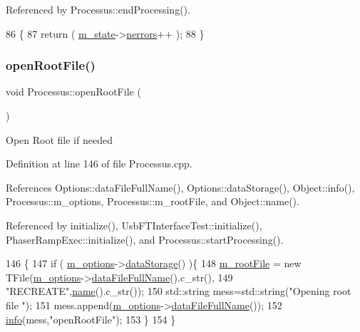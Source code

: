 Referenced by Processus\+::end\+Processing().


\begin{DoxyCode}
86                                 \{
87   \textcolor{keywordflow}{return} ( \hyperlink{classProcessus_ab3539eee42891ceae0baf4395ae7fb61}{m\_state}->\hyperlink{structProcState_a51a0f54ba62b07e07ac8518c5f32828d}{nerrors}++ );
88 \}
\end{DoxyCode}
\mbox{\label{classProcessus_aacf6812880c1d1a2bf14a4a39458f443}} 
\subsubsection{\texorpdfstring{open\+Root\+File()}{openRootFile()}}
{\footnotesize\ttfamily void Processus\+::open\+Root\+File (\begin{DoxyParamCaption}{ }\end{DoxyParamCaption})\hspace{0.3cm}{\ttfamily [inherited]}}

Open Root file if needed 

Definition at line 146 of file Processus.\+cpp.



References Options\+::data\+File\+Full\+Name(), Options\+::data\+Storage(), Object\+::info(), Processus\+::m\+\_\+options, Processus\+::m\+\_\+root\+File, and Object\+::name().



Referenced by initialize(), Usb\+F\+T\+Interface\+Test\+::initialize(), Phaser\+Ramp\+Exec\+::initialize(), and Processus\+::start\+Processing().


\begin{DoxyCode}
146                                \{
147   \textcolor{keywordflow}{if} ( \hyperlink{classProcessus_a74205f3c1e00c4448f7b3257c2351797}{m\_options}->\hyperlink{classOptions_aed7799d10139fa542055b982cb820192}{dataStorage}() )\{
148     \hyperlink{classProcessus_a76114f8cf2111e910c323a7ae05a015d}{m\_rootFile} = \textcolor{keyword}{new} TFile(\hyperlink{classProcessus_a74205f3c1e00c4448f7b3257c2351797}{m\_options}->\hyperlink{classOptions_ab1cd9f237e9c18fd72323c74565453f8}{dataFileFullName}().c\_str(),
149                            \textcolor{stringliteral}{"RECREATE"},\hyperlink{classObject_a300f4c05dd468c7bb8b3c968868443c1}{name}().c\_str());
150         std::string mess=std::string(\textcolor{stringliteral}{"Opening root file "});
151         mess.append(\hyperlink{classProcessus_a74205f3c1e00c4448f7b3257c2351797}{m\_options}->\hyperlink{classOptions_ab1cd9f237e9c18fd72323c74565453f8}{dataFileFullName}());
152         \hyperlink{classObject_a644fd329ea4cb85f54fa6846484b84a8}{info}(mess,\textcolor{stringliteral}{"openRootFile"});
153   \}
154 \}
\end{DoxyCode}
\mbox{\label{classAttrib_a7d4ef7e32d93cb287792b87b857e79f3}} 
